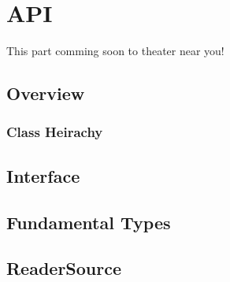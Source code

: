 
\part{API}

\Large{This part comming soon to theater near you!}

\chapter{Overview}
\section{Class Heirachy}

\chapter{Interface}

\chapter{Fundamental Types}

\chapter{ReaderSource}
